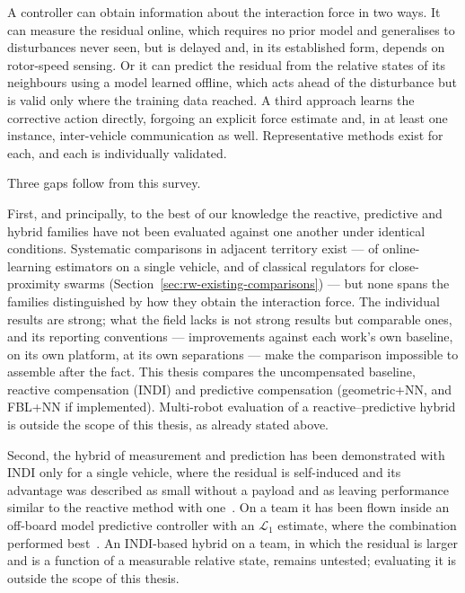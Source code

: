 A controller can obtain information about the interaction force in two ways. It can measure the
residual online, which requires no prior model and generalises to disturbances never seen, but is
delayed and, in its established form, depends on rotor-speed sensing. Or it can predict the
residual from the relative states of its neighbours using a model learned offline, which acts ahead
of the disturbance but is valid only where the training data reached. A third approach learns the
corrective action directly, forgoing an explicit force estimate and, in at least one instance,
inter-vehicle communication as well. Representative methods exist for each, and each is
individually validated.

Three gaps follow from this survey.

First, and principally, to the best of our knowledge the reactive, predictive and hybrid families
have not been evaluated against one another under identical conditions. Systematic comparisons in
adjacent territory exist --- of online-learning estimators on a single vehicle, and of classical
regulators for close-proximity swarms (Section~\ref{sec:rw-existing-comparisons}) --- but none
spans the families distinguished by how they obtain the interaction force. The individual results are strong; what the field lacks is not strong results
but comparable ones, and its reporting conventions --- improvements against each work's own
baseline, on its own platform, at its own separations --- make the comparison impossible to
assemble after the fact. This thesis compares the uncompensated baseline, reactive compensation
(INDI) and predictive compensation (geometric+NN, and FBL+NN if implemented). Multi-robot
evaluation of a reactive--predictive hybrid is outside the scope of this thesis, as already stated
above.

Second, the hybrid of measurement and prediction has been demonstrated with INDI only for a single
vehicle, where the residual is self-induced and its advantage was described as small without a
payload and as leaving performance similar to the reactive method with
one~\cite{cobobriesewitz2026lindi}. On a team it has been flown inside an off-board model predictive
controller with an $\mathcal{L}_1$ estimate, where the combination performed
best~\cite{hsieh2025onlineadaptation}. An INDI-based hybrid on a team, in which the residual is
larger and is a function of a measurable relative state, remains untested; evaluating it is
outside the scope of this thesis.

